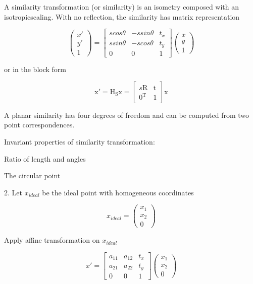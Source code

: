 \documentclass[conference]{IEEEtran}
\begin{document}
A similarity transformation (or similarity) is an isometry composed with an isotropicscaling. With no reflection, the similarity has matrix representation

\[ \begin{pmatrix} x{'}\\y{'}\\1 \end{pmatrix} = 
\begin{bmatrix}
scos\theta & -ssin\theta & t_{x}\\
ssin\theta & -scos\theta & t_{y}\\
0 & 0 & 1
\end{bmatrix}\begin{pmatrix} x\\y\\1 \end{pmatrix}
 \]
 
 or in the block form
 
 \[ \mathrm{x}{'} = \mathrm{H}_\mathrm{S}\mathrm{x} = 
 \begin{bmatrix}
s\mathrm{R}& \mathrm{t} \\
0^\mathrm{T} & 1
\end{bmatrix}\mathrm{x}
 \]
 
A planar similarity has four degrees of freedom and can be computed from two point correspondences.

Invariant properties of similarity transformation: 

\begin{description}[font=$\bullet$~\normalfont\scshape\color{red!50!black}]
  \item Ratio of length and angles
  \item The circular point
\end{description}

2. Let \( x_{ideal} \) be the ideal point with homogeneous coordinates 

\[ x_{ideal} = \begin{pmatrix} x_1\\x_2\\0 \end{pmatrix} \]

Apply affine transformation on \( x_{ideal} \)

\[ x{'} =  
\begin{bmatrix}
a_{11} & a_{12} & t_{x}\\
a_{21} & a_{22} & t_{y}\\
0 & 0 & 1
\end{bmatrix}\begin{pmatrix} x_1\\x_2\\0 \end{pmatrix}
 \]
 
\end{document}

